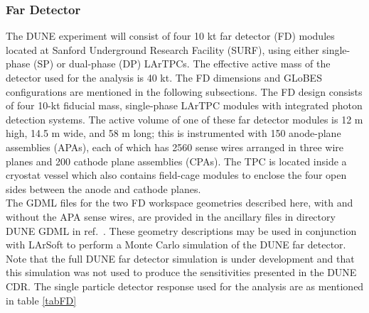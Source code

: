 \subsubsection{Far Detector}
The DUNE experiment will consist of four 10 kt far detector (FD) modules located at Sanford Underground Research Facility (SURF), using either single-phase (SP) or dual-phase (DP) LArTPCs. The effective active mass of the detector used for the analysis is 40 kt. The FD dimensions and GLoBES configurations are mentioned in the following subsections.
The FD design consists of four 10-kt fiducial mass, single-phase LArTPC modules with integrated photon detection systems. The active volume of one of these far detector modules is 12 m high, 14.5 m wide, and 58 m long; this is instrumented with 150 anode-plane assemblies (APAs), each of which has 2560 sense wires
arranged in three wire planes and 200 cathode plane assemblies (CPAs). The TPC is located inside a cryostat vessel which also contains field-cage modules to enclose the four open sides between the anode and cathode planes.\\
The GDML files for the two FD workspace geometries described here, with and without the APA
sense wires, are provided in the ancillary files in directory DUNE GDML in ref.~\cite{Alion:2016uaj}. These geometry descriptions
may be used in conjunction with LArSoft to perform a Monte Carlo simulation of the DUNE far detector. Note that the full DUNE far detector simulation is under development and that this simulation was not used to produce the sensitivities presented in the DUNE CDR.
The single particle detector response used for the analysis are as mentioned in table \ref{tabFD}
\begin{table}[h]
    \begin{center}
        \end{center}
        \caption{\label{tabFD}FD properties used for the analysis }
    \end{table} 
